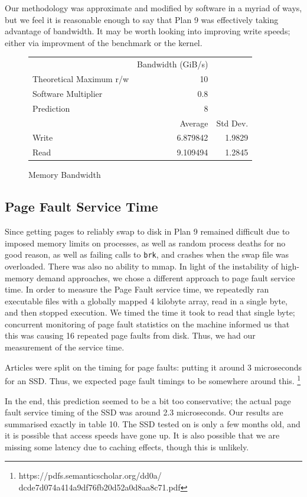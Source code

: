 \documentclass[letterpaper,twocolumn,10pt]{article}
\begin{document}
Our methodology was approximate and modified by software in a myriad of ways, but we feel it
is reasonable enough to say that Plan 9 was effectively taking advantage of bandwidth. It may
be worth looking into improving write speeds; either via improvment of the benchmark or the 
kernel.

\begin{figure}
	\centering
    \begin{tabular}{l r r}
      & Bandwidth (GiB/s)\\
      Theoretical Maximum r/w & 10\\
      Software Multiplier & 0.8 \\
      Prediction & 8\\
                   & Average & Std Dev.\\
      Write & 6.879842 & 1.9829 \\
      Read\protect\footnotemark & 9.109494  & 1.2845
\end{tabular}
\caption{Memory Bandwidth}
\label{tab:memorybandwidth}
\end{figure}
\subsection{Page Fault Service Time}
Since getting pages to reliably swap to disk in Plan 9 remained difficult due to imposed memory limits on processes, as well as random process deaths for no good reason, as well as failing calls to \texttt{brk}, and crashes when the swap file was overloaded. There was also no ability to mmap. In light of the instability of high-memory demand approaches, we chose a different approach to page fault service time. In order to measure the Page Fault service time, we repeatedly ran executable files with a globally
mapped 4 kilobyte array, read in a single byte, and then stopped execution. We timed the time it took to read that single byte; concurrent monitoring of page fault statistics on the machine informed us that this was causing 16 repeated page faults from disk. Thus, we had our measurement of the service time. 

Articles were split on the timing for page faults: putting it around 3 microseconds for an SSD. Thus, we expected page fault timings to be somewhere around this. 
\footnote{https://pdfs.semanticscholar.org/dd0a/
dcde7d074a414a9df76fb20d52a0d8aa8c71.pdf}

In the end, this prediction seemed to be a bit too conservative; the actual page fault service timing of the SSD was around 2.3 microseconds. Our results are summarised exactly in table 10. The SSD tested on is only a few months old, and it is possible that access speeds have gone up. It is also possible that we are missing some latency due to caching effects, though this is unlikely. 
\end{document}
